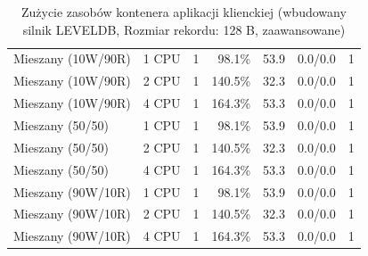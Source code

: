 \begin{table}[ht]
{\begin{tabular}{llcrrcc}
Mieszany (10W/90R) & 1 CPU & 1 & 98.1\% & 53.9 & 0.0/0.0 & 1 \\
Mieszany (10W/90R) & 2 CPU & 1 & 140.5\% & 32.3 & 0.0/0.0 & 1 \\
Mieszany (10W/90R) & 4 CPU & 1 & 164.3\% & 53.3 & 0.0/0.0 & 1 \\
Mieszany (50/50) & 1 CPU & 1 & 98.1\% & 53.9 & 0.0/0.0 & 1 \\
Mieszany (50/50) & 2 CPU & 1 & 140.5\% & 32.3 & 0.0/0.0 & 1 \\
Mieszany (50/50) & 4 CPU & 1 & 164.3\% & 53.3 & 0.0/0.0 & 1 \\
Mieszany (90W/10R) & 1 CPU & 1 & 98.1\% & 53.9 & 0.0/0.0 & 1 \\
Mieszany (90W/10R) & 2 CPU & 1 & 140.5\% & 32.3 & 0.0/0.0 & 1 \\
Mieszany (90W/10R) & 4 CPU & 1 & 164.3\% & 53.3 & 0.0/0.0 & 1 \\
\bottomrule
\end{tabular}%
}
\caption{Zużycie zasobów kontenera aplikacji klienckiej (wbudowany silnik LEVELDB, Rozmiar rekordu: 128 B, zaawansowane)}
\label{tab:resources_leveldb_small_0}
\end{table}
